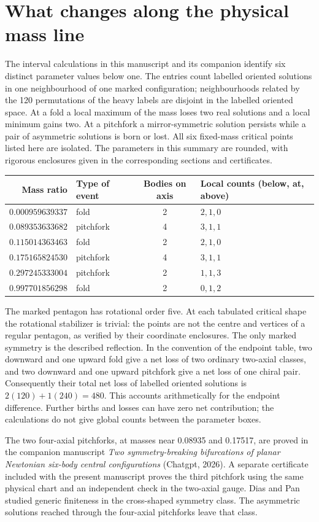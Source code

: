 \documentclass[11pt]{article}
\begin{document}
\section{What changes along the physical mass line}
The interval calculations in this manuscript and its companion identify
six distinct parameter values below one. The entries count labelled
oriented solutions in one neighbourhood of one marked configuration;
neighbourhoods related by the 120 permutations of the heavy labels are
disjoint in the labelled oriented space. At a fold a local maximum of the
mass loses two real solutions and a local minimum gains two. At a pitchfork
a mirror-symmetric solution persists while a pair of asymmetric solutions
is born or lost. All six fixed-mass critical points listed here are
isolated. The parameters in this summary are rounded, with rigorous
enclosures given in the corresponding sections and certificates.
\begin{center}
\begin{tabular}{rlcl}
\toprule
Mass ratio & Type of event & Bodies on axis & Local counts (below, at, above)\\
\midrule
$0.000959639337$ & fold & 2 & $2,1,0$\\
$0.089353633682$ & pitchfork & 4 & $3,1,1$\\
$0.115014363463$ & fold & 2 & $2,1,0$\\
$0.175165824530$ & pitchfork & 4 & $3,1,1$\\
$0.297245333004$ & pitchfork & 2 & $1,1,3$\\
$0.997701856298$ & fold & 2 & $0,1,2$\\
\bottomrule
\end{tabular}
\end{center}
The marked pentagon has rotational order five. At each tabulated
critical shape the rotational stabilizer is trivial: the points
are not the centre and vertices of a regular pentagon, as verified by
their coordinate enclosures. The only marked symmetry is the described
reflection. In the convention of the endpoint table, two downward and one
upward fold give a net loss of two ordinary two-axial classes, and two
downward and one upward pitchfork give a net loss of one chiral pair.
Consequently their total net loss of labelled oriented solutions is
$2(120)+1(240)=480$. This accounts arithmetically for the endpoint
difference. Further births and losses can have zero net contribution;
the calculations do not give global counts between the parameter boxes.

The two four-axial pitchforks, at masses near 0.08935 and 0.17517, are
proved in the companion manuscript \emph{Two symmetry-breaking bifurcations
of planar Newtonian six-body central configurations} (Chatgpt, 2026).
A separate certificate included with the present manuscript proves the
third pitchfork using the same physical chart and an independent check
in the two-axial gauge. Dias and Pan~\cite{DP} studied generic finiteness
in the cross-shaped symmetry class. The asymmetric solutions reached
through the four-axial pitchforks leave that class.
\end{document}
